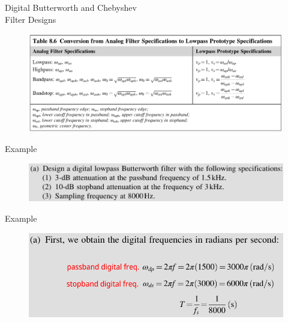 \documentclass[pdflatex,compress,mathserif]{beamer}
\begin{document}
\begin{frame}{Digital Butterworth and Chebyshev\\Filter Designs}
    \begin{figure}
        \centering
        \includegraphics[width=\linewidth]{./img/img16.png}
    \end{figure}
\end{frame}

\begin{frame}{Example}
    \begin{figure}
        \centering
        \includegraphics[width=\linewidth]{./img/img17.png}
    \end{figure}
\end{frame}

\begin{frame}{Example}
    \begin{figure}
        \centering
        \includegraphics[width=\linewidth]{./img/img18.png}
    \end{figure}
\end{frame}
\end{document}
